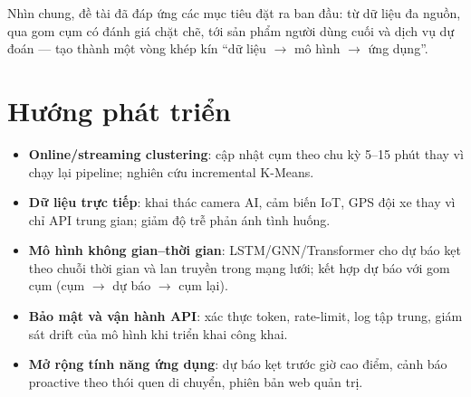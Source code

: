 Nhìn chung, đề tài đã đáp ứng các mục tiêu đặt ra ban đầu: từ dữ liệu đa nguồn, qua gom cụm có đánh giá chặt chẽ, tới sản phẩm người dùng cuối và dịch vụ dự đoán --- tạo thành một vòng khép kín ``dữ liệu $\rightarrow$ mô hình $\rightarrow$ ứng dụng''.

\section{Hướng phát triển}
\begin{itemize}[nosep]
 \item \textbf{Online/streaming clustering}: cập nhật cụm theo chu kỳ 5--15 phút thay vì chạy lại pipeline; nghiên cứu incremental K-Means.
 \item \textbf{Dữ liệu trực tiếp}: khai thác camera AI, cảm biến IoT, GPS đội xe thay vì chỉ API trung gian; giảm độ trễ phản ánh tình huống.
 \item \textbf{Mô hình không gian--thời gian}: LSTM/GNN/Transformer cho dự báo kẹt theo chuỗi thời gian và lan truyền trong mạng lưới; kết hợp dự báo với gom cụm (cụm $\rightarrow$ dự báo $\rightarrow$ cụm lại).
 \item \textbf{Bảo mật và vận hành API}: xác thực token, rate-limit, log tập trung, giám sát drift của mô hình khi triển khai công khai.
 \item \textbf{Mở rộng tính năng ứng dụng}: dự báo kẹt trước giờ cao điểm, cảnh báo proactive theo thói quen di chuyển, phiên bản web quản trị.
\end{itemize}
